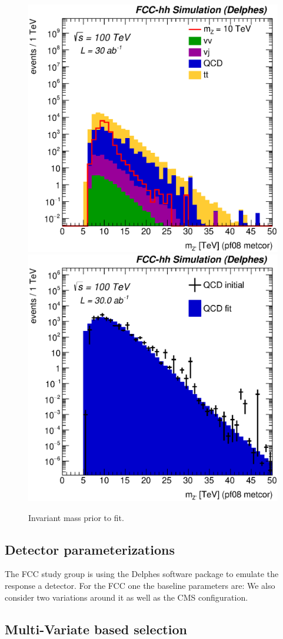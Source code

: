 \documentclass{cernrep}
\begin{document}
\begin{figure}[!htb]\centering
\includegraphics[width=0.33\columnwidth]{Fig/Zptt/Mj1j2_pf08_MetCorr_sel8_nostack_log.eps}
\includegraphics[width=0.33\columnwidth]{Fig/Zptt/Zptt_QCD_sel8_Mj1j2_pf08_MetCorr_fit.eps}
\caption{Invariant mass prior to fit.}
\label{fig:hadronicresonances_nofit}
\end{figure}

\subsection{Detector parameterizations}
\label{subsec:detparam}

The FCC study group is using the Delphes software package to emulate the response a detector. 
For the FCC one the baseline parameters are:
We also consider two variations around it as well as the CMS configuration.


\subsection{Multi-Variate based selection}
\label{subsec:mvatagger}
\end{document}
